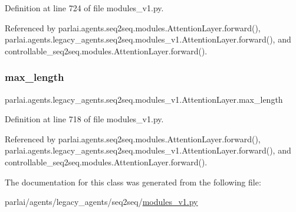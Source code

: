 Definition at line 724 of file modules\+\_\+v1.\+py.



Referenced by parlai.\+agents.\+seq2seq.\+modules.\+Attention\+Layer.\+forward(), parlai.\+agents.\+legacy\+\_\+agents.\+seq2seq.\+modules\+\_\+v1.\+Attention\+Layer.\+forward(), and controllable\+\_\+seq2seq.\+modules.\+Attention\+Layer.\+forward().

\mbox{\label{classparlai_1_1agents_1_1legacy__agents_1_1seq2seq_1_1modules__v1_1_1AttentionLayer_afb020d5934ba3cee17968fe893417ce8}} 
\subsubsection{\texorpdfstring{max\+\_\+length}{max\_length}}
{\footnotesize\ttfamily parlai.\+agents.\+legacy\+\_\+agents.\+seq2seq.\+modules\+\_\+v1.\+Attention\+Layer.\+max\+\_\+length}



Definition at line 718 of file modules\+\_\+v1.\+py.



Referenced by parlai.\+agents.\+seq2seq.\+modules.\+Attention\+Layer.\+forward(), parlai.\+agents.\+legacy\+\_\+agents.\+seq2seq.\+modules\+\_\+v1.\+Attention\+Layer.\+forward(), and controllable\+\_\+seq2seq.\+modules.\+Attention\+Layer.\+forward().



The documentation for this class was generated from the following file\+:\begin{DoxyCompactItemize}
\item 
parlai/agents/legacy\+\_\+agents/seq2seq/\hyperlink{modules__v1_8py}{modules\+\_\+v1.\+py}\end{DoxyCompactItemize}

